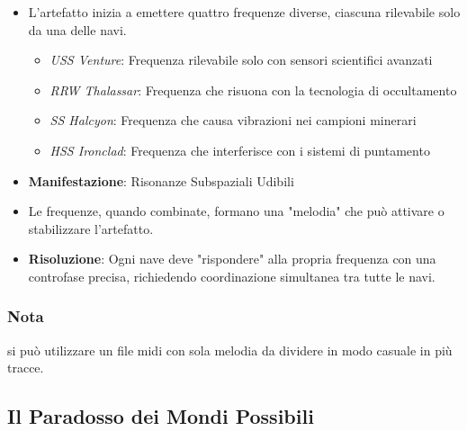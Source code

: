\documentclass[letterpaper,twocolumn,openany,nodeprecatedcode]{dndbook}
\begin{document}
\begin{itemize}
    \item L'artefatto inizia a emettere quattro frequenze diverse, ciascuna rilevabile solo da una delle navi.
\begin{itemize}
    \item \textit{USS Venture}: Frequenza rilevabile solo con sensori scientifici avanzati
    \item \textit{RRW Thalassar}: Frequenza che risuona con la tecnologia di occultamento
    \item \textit{SS Halcyon}: Frequenza che causa vibrazioni nei campioni minerari
    \item \textit{HSS Ironclad}: Frequenza che interferisce con i sistemi di puntamento
\end{itemize}
    \item \textbf{Manifestazione}: Risonanze Subspaziali Udibili
    \item Le frequenze, quando combinate, formano una "melodia" che può attivare o stabilizzare l'artefatto.
    \item \textbf{Risoluzione}: Ogni nave deve "rispondere" alla propria frequenza con una controfase precisa, richiedendo coordinazione simultanea tra tutte le navi.
\end{itemize}

\subsubsection{Nota}
si può utilizzare un file midi con sola melodia da dividere in modo casuale in più tracce.

\subsection{Il Paradosso dei Mondi Possibili}
\end{document}
